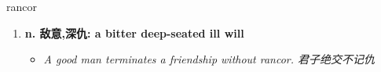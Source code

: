 
\begin{frame}
{\huge rancor}
\begin{center}
\begin{enumerate}\Large
  \item \textbf{n. 敌意,深仇: a bitter deep-seated ill will}
  \begin{itemize}
    \item \em{\Large{A good man terminates a friendship without rancor. 君子绝交不记仇}}
  \end{itemize}
\end{enumerate}
\end{center}
\end{frame}
